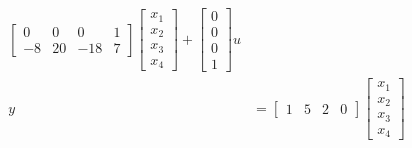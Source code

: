 \begin{exercise}
\begin{align*}
\begin{bmatrix}
            0 & 0 & 0 & 1 \\
            -8 & 20 & -18 & 7
        \end{bmatrix} \begin{bmatrix}
            x_1 \\
            x_2 \\
            x_3 \\
            x_4
        \end{bmatrix} + \begin{bmatrix}
            0 \\
            0 \\
            0 \\
            1
        \end{bmatrix} u \\
        y &= \begin{bmatrix}
            1 & 5 & 2 & 0
        \end{bmatrix} \begin{bmatrix}
            x_1 \\
            x_2 \\
            x_3 \\
            x_4
        \end{bmatrix}
    \end{align*}
\end{exercise}

\setcounter{exercise}{6}

